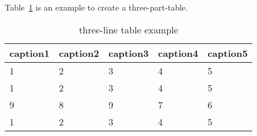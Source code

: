 \documentclass{article}
\begin{document}
Table~\ref{tab:tabular1} is an example to create a three-part-table.

\begin{table}[htbp]
    \caption{three-line table example}
    \label{tab:tabular1}
    \centering
    \begin{tabular}{lllll}
        \toprule
        caption1 & caption2 & caption3 & caption4 & caption5 \\
        \midrule
        1        & 2        & 3        & 4        & 5        \\
        1        & 2        & 3        & 4        & 5        \\
        9        & 8        & 9        & 7        & 6        \\
        1        & 2        & 3        & 4        & 5        \\
        \bottomrule
    \end{tabular}
\end{table}
\end{document}
